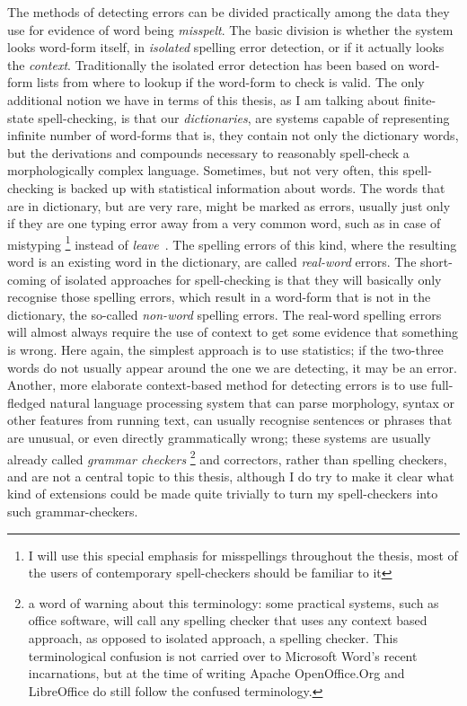 \documentclass[officiallayout]{unihelcompling}
\newcommand\misspelt{\bgroup\markoverwith
{\textcolor{red}{\lower3.5pt\hbox{\sixly \char58}}}\ULon}
\begin{document}
The methods of detecting errors can be divided practically among the data they
use for evidence of word being \emph{misspelt}. The basic division is whether
the system looks word-form itself, in \emph{isolated} spelling error detection,
or if it actually looks the \emph{context}. Traditionally the isolated error
detection has been based on word-form lists from where to lookup if the
word-form to check is valid. The only additional notion we have in terms of
this thesis, as I am talking about finite-state spell-checking, is that our
\emph{dictionaries}, are systems capable of representing infinite number of
word-forms that is, they contain not only the dictionary words, but the
derivations and compounds necessary to reasonably spell-check a morphologically
complex language. Sometimes, but not very often, this spell-checking is backed
up with statistical information about words. The words that are in dictionary,
but are very rare, might be marked as errors, usually just only if they are one
typing error away from a very common word, such as in case of mistyping
\misspelt{lave}\footnote{I will use this special emphasis for misspellings
    throughout the thesis, most of the users of contemporary spell-checkers
should be familiar to it} instead of \emph{leave}~\citep{kukich1992techniques}.
The spelling errors of this kind, where the resulting word is an existing word
in the dictionary, are called \emph{real-word} errors.  The short-coming of
isolated approaches for spell-checking is that they will basically only
recognise those spelling errors, which result in a word-form that is not in the
dictionary, the so-called \emph{non-word} spelling errors. The real-word
spelling errors will almost always require the use of context to get some
evidence that something is wrong. Here again, the simplest approach is to use
statistics; if the two-three words do not usually appear around the one we are
detecting, it may be an error. Another, more elaborate context-based method for
detecting errors is to use full-fledged natural language processing system that
can parse morphology, syntax or other features from running text, can usually
recognise sentences or phrases that are unusual, or even directly grammatically
wrong; these systems are usually already called \emph{grammar checkers}
\footnote{a word of warning about this terminology: some practical
    systems, such as office software, will call any spelling checker that uses
    any context based approach, as opposed to isolated approach, a spelling
checker. This terminological confusion is not carried over to Microsoft Word's
recent incarnations, but at the time of writing Apache OpenOffice.Org and
LibreOffice do still follow the confused terminology.} and
correctors, rather than spelling checkers, and are not a central topic to 
this thesis, although I do try to make it clear what kind of extensions could
be made quite trivially to turn my spell-checkers into such grammar-checkers.
\end{document}
